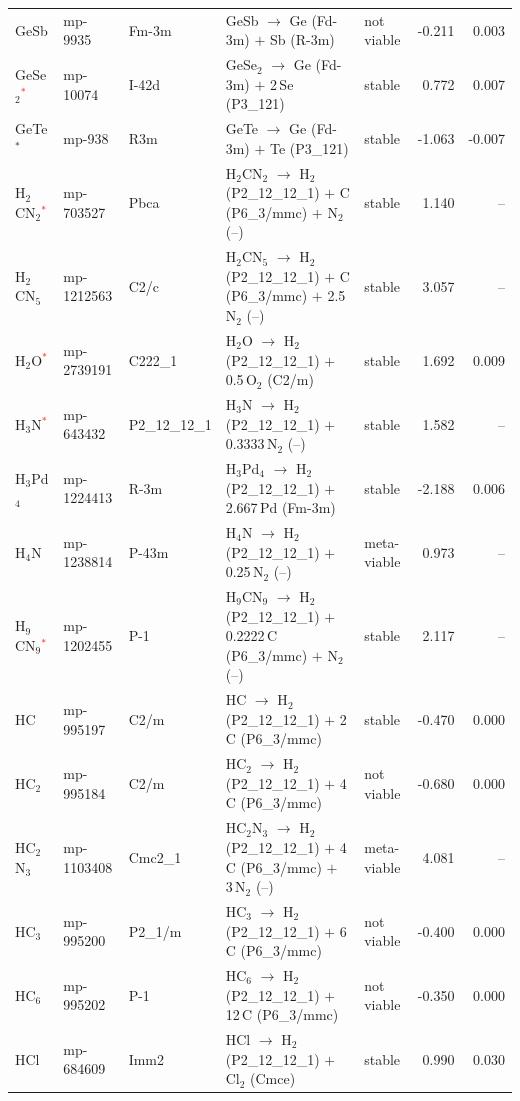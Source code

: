 \begin{longtable}{@{}ll l@{\hspace{4pt}} p{4.6cm} l@{\hspace{4pt}} rr@{}}
GeSb & mp-9935 & Fm-3m & GeSb $\to$ Ge (Fd-3m) $+$ Sb (R-3m) & not viable & -0.211 & 0.003 \\
GeSe$_{2}$\textcolor{red}{$^*$} & mp-10074 & I-42d & GeSe$_{2}$ $\to$ Ge (Fd-3m) $+$ 2\,Se (P3\_121) & stable & 0.772 & 0.007 \\
GeTe$^*$ & mp-938 & R3m & GeTe $\to$ Ge (Fd-3m) $+$ Te (P3\_121) & stable & -1.063 & -0.007 \\
H$_{2}$CN$_{2}$\textcolor{red}{$^*$} & mp-703527 & Pbca & H$_{2}$CN$_{2}$ $\to$ H$_{2}$ (P2\_12\_12\_1) $+$ C (P6\_3/mmc) $+$ N$_{2}$ (--) & stable & 1.140 & -- \\
H$_{2}$CN$_{5}$ & mp-1212563 & C2/c & H$_{2}$CN$_{5}$ $\to$ H$_{2}$ (P2\_12\_12\_1) $+$ C (P6\_3/mmc) $+$ 2.5\,N$_{2}$ (--) & stable & 3.057 & -- \\
H$_{2}$O\textcolor{red}{$^*$} & mp-2739191 & C222\_1 & H$_{2}$O $\to$ H$_{2}$ (P2\_12\_12\_1) $+$ 0.5\,O$_{2}$ (C2/m) & stable & 1.692 & 0.009 \\
H$_{3}$N\textcolor{red}{$^*$} & mp-643432 & P2\_12\_12\_1 & H$_{3}$N $\to$ H$_{2}$ (P2\_12\_12\_1) $+$ 0.3333\,N$_{2}$ (--) & stable & 1.582 & -- \\
H$_{3}$Pd$_{4}$ & mp-1224413 & R-3m & H$_{3}$Pd$_{4}$ $\to$ H$_{2}$ (P2\_12\_12\_1) $+$ 2.667\,Pd (Fm-3m) & stable & -2.188 & 0.006 \\
H$_{4}$N & mp-1238814 & P-43m & H$_{4}$N $\to$ H$_{2}$ (P2\_12\_12\_1) $+$ 0.25\,N$_{2}$ (--) & meta-viable & 0.973 & -- \\
H$_{9}$CN$_{9}$\textcolor{red}{$^*$} & mp-1202455 & P-1 & H$_{9}$CN$_{9}$ $\to$ H$_{2}$ (P2\_12\_12\_1) $+$ 0.2222\,C (P6\_3/mmc) $+$ N$_{2}$ (--) & stable & 2.117 & -- \\
HC & mp-995197 & C2/m & HC $\to$ H$_{2}$ (P2\_12\_12\_1) $+$ 2\,C (P6\_3/mmc) & stable & -0.470 & 0.000 \\
HC$_{2}$ & mp-995184 & C2/m & HC$_{2}$ $\to$ H$_{2}$ (P2\_12\_12\_1) $+$ 4\,C (P6\_3/mmc) & not viable & -0.680 & 0.000 \\
HC$_{2}$N$_{3}$ & mp-1103408 & Cmc2\_1 & HC$_{2}$N$_{3}$ $\to$ H$_{2}$ (P2\_12\_12\_1) $+$ 4\,C (P6\_3/mmc) $+$ 3\,N$_{2}$ (--) & meta-viable & 4.081 & -- \\
HC$_{3}$ & mp-995200 & P2\_1/m & HC$_{3}$ $\to$ H$_{2}$ (P2\_12\_12\_1) $+$ 6\,C (P6\_3/mmc) & not viable & -0.400 & 0.000 \\
HC$_{6}$ & mp-995202 & P-1 & HC$_{6}$ $\to$ H$_{2}$ (P2\_12\_12\_1) $+$ 12\,C (P6\_3/mmc) & not viable & -0.350 & 0.000 \\
HCl & mp-684609 & Imm2 & HCl $\to$ H$_{2}$ (P2\_12\_12\_1) $+$ Cl$_{2}$ (Cmce) & stable & 0.990 & 0.030 \\

\end{longtable}

